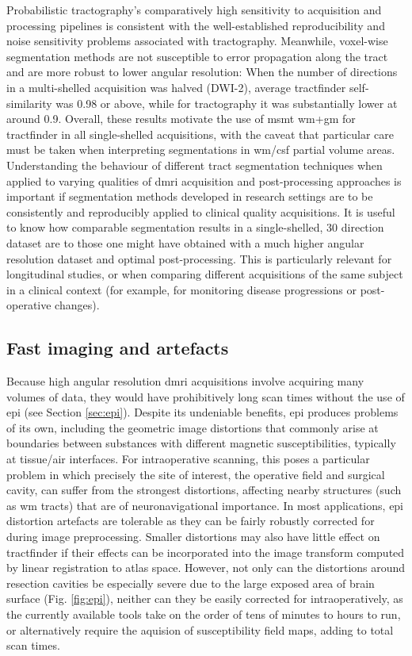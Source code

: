 Probabilistic tractography's comparatively high sensitivity to acquisition and processing pipelines is consistent with the well-established reproducibility and noise sensitivity problems associated with tractography.
Meanwhile, voxel-wise segmentation methods are not susceptible to error propagation along the tract and are more robust to lower angular resolution:
When the number of directions in a multi-shelled acquisition was halved (DWI-2), average tractfinder self-similarity was 0.98 or above, while for tractography it was substantially lower at around 0.9.
Overall, these results motivate the use of \gls{msmt} \gls{wm}+\gls{gm} for tractfinder in all single-shelled acquisitions, with the caveat that particular care must be taken when interpreting segmentations in \gls{wm}/\gls{csf} partial volume areas.
Understanding the behaviour of different tract segmentation techniques when applied to varying qualities of \gls{dmri} acquisition and post-processing approaches is important if segmentation methods developed in research settings are to be consistently and reproducibly applied to clinical quality acquisitions.
It is useful to know how comparable segmentation results in a single-shelled, 30 direction dataset are to those one might have obtained with a much higher angular resolution dataset and optimal post-processing.
This is particularly relevant for longitudinal studies, or when comparing different acquisitions of the same subject in a clinical context (for example, for monitoring disease progressions or post-operative changes).

\subsection{Fast imaging and artefacts}

Because high angular resolution \gls{dmri} acquisitions involve acquiring many volumes of data, they would have prohibitively long scan times without the use of \gls{epi} (see Section \ref{sec:epi}).
Despite its undeniable benefits, \gls{epi} produces problems of its own, including the geometric image distortions that commonly arise at boundaries between substances with different magnetic susceptibilities, typically at tissue/air interfaces.
For intraoperative scanning, this poses a particular problem in which precisely the site of interest, the operative field and surgical cavity, can suffer from the strongest distortions, affecting nearby structures (such as \gls{wm} tracts) that are of neuronavigational importance\autocite{Yang2022}.
In most applications, \gls{epi} distortion artefacts are tolerable as they can be fairly robustly corrected for during image preprocessing.
Smaller distortions may also have little effect on tractfinder if their effects can be incorporated into the image transform computed by linear registration to atlas space.
However, not only can the distortions around resection cavities be especially severe due to the large exposed area of brain surface (Fig. \ref{fig:epi}), neither can they be easily corrected for intraoperatively, as the currently available tools take on the order of tens of minutes to hours to run, or alternatively require the aquision of susceptibility field maps, adding to total scan times.

